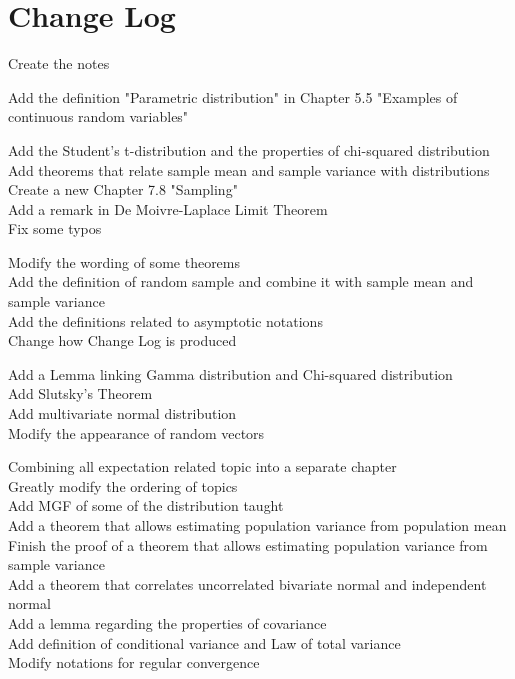\documentclass{huhtakm-template-book}
\begin{document}
\chapter*{Change Log}
\begin{description}[style=nextline]
	\item[1.0]
	Create the notes
	\item[1.1]
	Add the definition "Parametric distribution" in Chapter 5.5 "Examples of continuous random variables"
	\item[1.2]
	Add the Student's t-distribution and the properties of chi-squared distribution\\
	Add theorems that relate sample mean and sample variance with distributions\\
	Create a new Chapter 7.8 "Sampling"\\
	Add a remark in De Moivre-Laplace Limit Theorem\\
	Fix some typos
	\item[1.3]
	Modify the wording of some theorems\\
	Add the definition of random sample and combine it with sample mean and sample variance\\
	Add the definitions related to asymptotic notations\\
	Change how Change Log is produced
	\item[1.4] Add a Lemma linking Gamma distribution and Chi-squared distribution\\
	Add Slutsky's Theorem\\
	Add multivariate normal distribution\\
	Modify the appearance of random vectors
	\item[2.0]
	Combining all expectation related topic into a separate chapter\\
	Greatly modify the ordering of topics\\
	Add MGF of some of the distribution taught\\
	Add a theorem that allows estimating population variance from population mean\\
	Finish the proof of a theorem that allows estimating population variance from sample variance\\
	Add a theorem that correlates uncorrelated bivariate normal and independent normal\\
	Add a lemma regarding the properties of covariance\\
	Add definition of conditional variance and Law of total variance\\
	Modify notations for regular convergence
\end{description}
\end{document}

